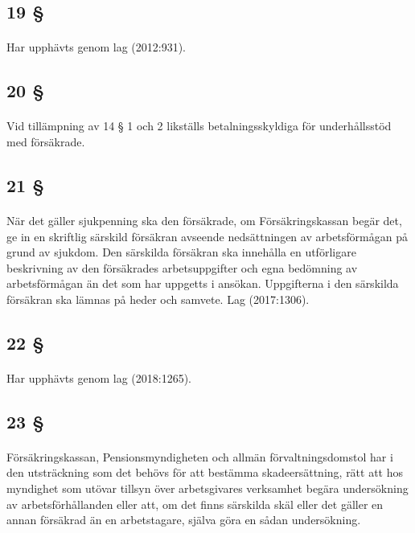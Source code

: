 \documentclass[a4paper,notitlepage,openany,10pt]{book}
\begin{document}
\subsection*{19 §}
\paragraph*{}
Har upphävts genom
lag (2012:931).
\subsection*{20 §}
\paragraph*{}
Vid tillämpning av 14 § 1 och 2 likställs betalningsskyldiga för underhållsstöd med försäkrade.
\subsection*{21 §}
\paragraph*{}
När det gäller sjukpenning ska den försäkrade, om Försäkringskassan begär det, ge in en skriftlig särskild försäkran avseende nedsättningen av arbetsförmågan på grund av sjukdom. Den särskilda försäkran ska innehålla en utförligare beskrivning av den försäkrades arbetsuppgifter och egna bedömning av arbetsförmågan än det som har uppgetts i ansökan. Uppgifterna i den särskilda försäkran ska lämnas på heder och samvete.
Lag (2017:1306).
\subsection*{22 §}
\paragraph*{}
Har upphävts genom
lag (2018:1265).
\subsection*{23 §}
\paragraph*{}
Försäkringskassan, Pensionsmyndigheten och allmän förvaltningsdomstol har i den utsträckning som det behövs för att bestämma skadeersättning, rätt att hos myndighet som utövar tillsyn över arbetsgivares verksamhet begära undersökning av arbetsförhållanden eller att, om det finns särskilda skäl eller det gäller en annan försäkrad än en arbetstagare, själva göra en sådan undersökning.
\end{document}
